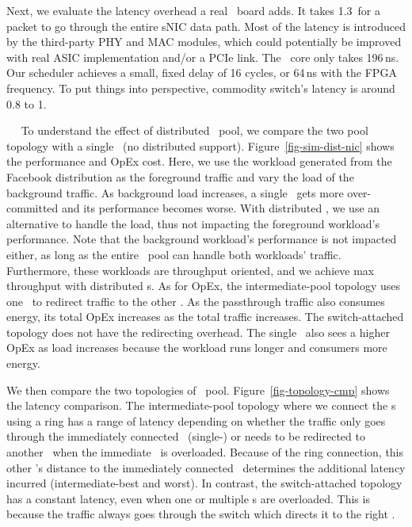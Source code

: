 Next, we evaluate the latency overhead a real \snic\ board adds.  
It takes 1.3\mus\ for a packet to go through the entire sNIC data path. %
Most of the latency is introduced by the third-party PHY and MAC modules, which could potentially be improved with real ASIC implementation and/or a PCIe link. 
The \snic\ core only takes 196\,ns.
Our scheduler achieves a small, fixed delay of 16 cycles, or 64\,ns with the FPGA frequency. 
To put things into perspective, commodity switch's latency is around 0.8 to 1\mus.  



~~
To understand the effect of distributed \snic\ pool, we compare the two pool topology with a single \snic\ (no distributed support).
Figure~\ref{fig-sim-dist-nic} shows the performance and OpEx cost.
Here, we use the workload generated from the Facebook distribution as the foreground traffic and vary the load of the background traffic.
As background load increases, a single \snic\ gets more over-committed and its performance becomes worse.
With distributed \snic, we use an alternative \snic{} to handle the load, thus not impacting the foreground workload's performance. Note that the background workload's performance is not impacted either, as long as the entire \snic\ pool can handle both workloads' traffic. Furthermore, these workloads are throughput oriented, and we achieve max throughput with distributed \snic{}s.
As for OpEx, the intermediate-pool topology uses one \snic\ to redirect traffic to the other \snic.
As the passthrough traffic also consumes energy, its total OpEx increases as the total traffic increases.
The switch-attached topology does not have the redirecting overhead.
The single \snic\ also sees a higher OpEx as load increases because the workload runs longer and consumers more energy.

We then compare the two topologies of \snic\ pool. %
Figure~\ref{fig-topology-cmp} shows the latency comparison.
The intermediate-pool topology where we connect the \snic{}s using a ring has a range of latency depending on whether the traffic only goes through the immediately connected \snic\ (single-\snic) or needs to be redirected to another \snic\ when the immediate \snic\ is overloaded. 
Because of the ring connection, this other \snic's distance to the immediately connected \snic\ determines the additional latency incurred (intermediate-best and worst).
In contrast, the switch-attached topology has a constant latency, even when one or multiple \snic{}s are overloaded. This is because the traffic always goes through the switch which directs it to the right \snic.

